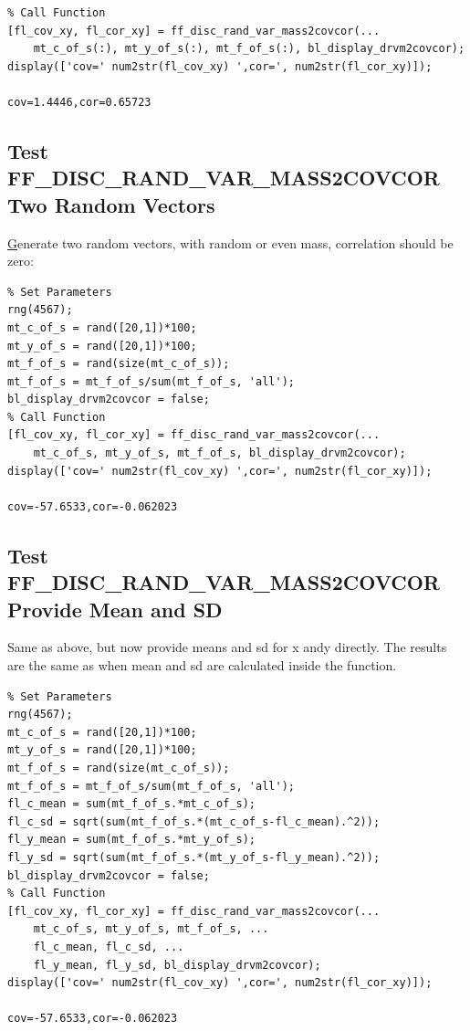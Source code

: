 \documentclass[
]{book}
\begin{document}
\begin{verbatim}
% Call Function
[fl_cov_xy, fl_cor_xy] = ff_disc_rand_var_mass2covcor(...
    mt_c_of_s(:), mt_y_of_s(:), mt_f_of_s(:), bl_display_drvm2covcor);
display(['cov=' num2str(fl_cov_xy) ',cor=', num2str(fl_cor_xy)]);

cov=1.4446,cor=0.65723
\end{verbatim}

\hypertarget{test-ff_disc_rand_var_mass2covcor-two-random-vectors}{%
\subsection{Test FF\_DISC\_RAND\_VAR\_MASS2COVCOR Two Random Vectors}\label{test-ff_disc_rand_var_mass2covcor-two-random-vectors}}

\href{https://fanwangecon.github.io/Stat4Econ/probability_discrete/htmlpdfr/poisson.html}{G}enerate
two random vectors, with random or even mass, correlation should be
zero:

\begin{verbatim}
% Set Parameters
rng(4567);
mt_c_of_s = rand([20,1])*100;
mt_y_of_s = rand([20,1])*100;
mt_f_of_s = rand(size(mt_c_of_s));
mt_f_of_s = mt_f_of_s/sum(mt_f_of_s, 'all');
bl_display_drvm2covcor = false;
% Call Function
[fl_cov_xy, fl_cor_xy] = ff_disc_rand_var_mass2covcor(...
    mt_c_of_s, mt_y_of_s, mt_f_of_s, bl_display_drvm2covcor);
display(['cov=' num2str(fl_cov_xy) ',cor=', num2str(fl_cor_xy)]);

cov=-57.6533,cor=-0.062023
\end{verbatim}

\hypertarget{test-ff_disc_rand_var_mass2covcor-provide-mean-and-sd}{%
\subsection{Test FF\_DISC\_RAND\_VAR\_MASS2COVCOR Provide Mean and SD}\label{test-ff_disc_rand_var_mass2covcor-provide-mean-and-sd}}

Same as above, but now provide means and sd for x andy directly. The
results are the same as when mean and sd are calculated inside the
function.

\begin{verbatim}
% Set Parameters
rng(4567);
mt_c_of_s = rand([20,1])*100;
mt_y_of_s = rand([20,1])*100;
mt_f_of_s = rand(size(mt_c_of_s));
mt_f_of_s = mt_f_of_s/sum(mt_f_of_s, 'all');
fl_c_mean = sum(mt_f_of_s.*mt_c_of_s);
fl_c_sd = sqrt(sum(mt_f_of_s.*(mt_c_of_s-fl_c_mean).^2));
fl_y_mean = sum(mt_f_of_s.*mt_y_of_s);
fl_y_sd = sqrt(sum(mt_f_of_s.*(mt_y_of_s-fl_y_mean).^2));
bl_display_drvm2covcor = false;
% Call Function
[fl_cov_xy, fl_cor_xy] = ff_disc_rand_var_mass2covcor(...
    mt_c_of_s, mt_y_of_s, mt_f_of_s, ...
    fl_c_mean, fl_c_sd, ...
    fl_y_mean, fl_y_sd, bl_display_drvm2covcor);
display(['cov=' num2str(fl_cov_xy) ',cor=', num2str(fl_cor_xy)]);

cov=-57.6533,cor=-0.062023
\end{verbatim}
\end{document}
